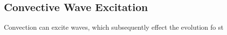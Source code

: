 {\color{purple}
\subsection{Convective Wave Excitation}
}

Convection can excite waves, which subsequently effect the evolution fo st
